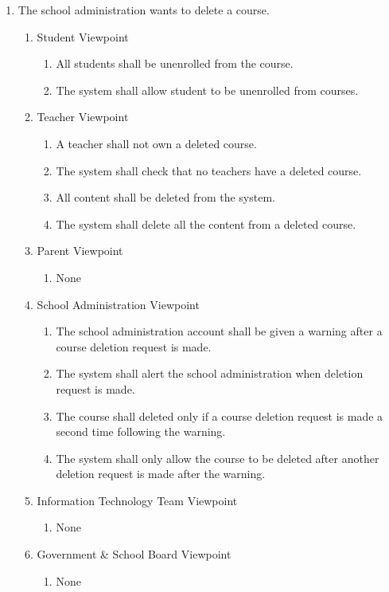 \documentclass[]{article}
\begin{document}
\begin{enumerate}[{BE}1.]
	\item The school administration wants to delete a course.
	\begin{enumerate}[{VP1}.1]
		\item Student Viewpoint
			\begin{enumerate}
				\item All students shall be unenrolled from the course.
				\item The system shall allow student to be unenrolled from courses.
			\end{enumerate}
		\item Teacher Viewpoint
			\begin{enumerate}
				\item A teacher shall not own a deleted course.
				\item The system shall check that no teachers have a deleted course.
				\item{All content shall be deleted from the system.}
				\item The system shall delete all the content from a deleted course.
			\end{enumerate}
		\item Parent Viewpoint
			\begin{enumerate}
				\item None
			\end{enumerate}
		\item School Administration Viewpoint
			\begin{enumerate}
				\item The school administration account shall be given a warning after a
course
deletion request is made.
				\item The system shall alert the school administration when deletion request 
is made.
\item The course shall deleted only if a course deletion
request is made a second time following the warning.
\item The system shall only allow the course to be deleted after another 
deletion request is made after the warning.
			\end{enumerate}
		\item Information Technology Team Viewpoint
			\begin{enumerate}
				\item None
			\end{enumerate}
		\item Government \& School Board Viewpoint
			\begin{enumerate}
				\item None
			\end{enumerate}
	\end{enumerate}
\end{enumerate}
\end{document}
